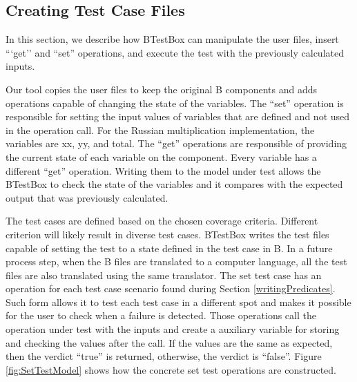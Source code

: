 \documentclass[runningheads]{llncs}
\begin{document}
\subsection{Creating Test Case Files}

In this section, we describe how BTestBox can manipulate the user files, insert ```get'' and ``set'' operations, and execute the test with the previously calculated inputs. 

Our tool copies the user files to keep the original B components and adds operations capable of changing the state of the variables. The ``set'' operation is responsible for setting the input values of variables that are defined and not used in the operation call. For the Russian multiplication implementation, the variables are xx, yy, and total. The ``get'' operations are responsible of providing the current state of each variable on the component. Every variable has a different ``get'' operation. Writing them to the model under test allows the BTestBox to check the state of the variables and it compares with the expected output that was previously calculated.

The test cases are defined based on the chosen coverage criteria. Different criterion will likely result in diverse test cases. BTestBox writes the test files capable of setting the test to a state defined in the test case in B. In a future process step, when the B files are translated to a computer language, all the test files are also translated using the same translator. The set test case has an operation for each test case scenario found during Section \ref{writingPredicates}. Such form allows it to test each test case in a different spot and makes it possible for the user to check when a failure is detected. Those operations call the operation under test with the inputs and create a auxiliary variable for storing and checking the values after the call. If the values are the same as expected, then the verdict ``true'' is returned, otherwise, the verdict is ``false''. Figure \ref{fig:SetTestModel} shows how the concrete set test operations are constructed.
\end{document}
